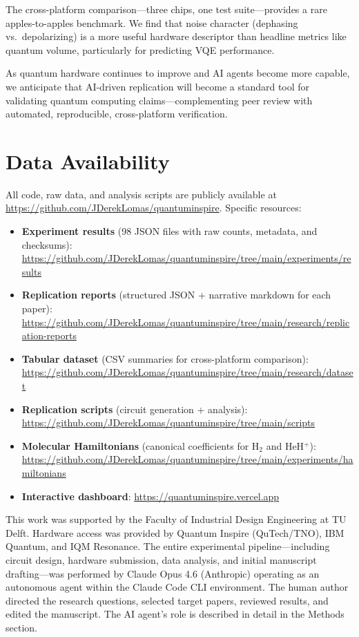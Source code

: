 \documentclass[twocolumn,prl,superscriptaddress,nofootinbib]{revtex4-2}
\begin{document}
The cross-platform comparison---three chips, one test suite---provides a rare apples-to-apples benchmark.
We find that noise character (dephasing vs.\ depolarizing) is a more useful hardware descriptor than headline metrics like quantum volume, particularly for predicting VQE performance.

As quantum hardware continues to improve and AI agents become more capable, we anticipate that AI-driven replication will become a standard tool for validating quantum computing claims---complementing peer review with automated, reproducible, cross-platform verification.

\section*{Data Availability}

All code, raw data, and analysis scripts are publicly available at \url{https://github.com/JDerekLomas/quantuminspire}. Specific resources:

\begin{itemize}
  \item \textbf{Experiment results} (98 JSON files with raw counts, metadata, and checksums): \url{https://github.com/JDerekLomas/quantuminspire/tree/main/experiments/results}
  \item \textbf{Replication reports} (structured JSON + narrative markdown for each paper): \url{https://github.com/JDerekLomas/quantuminspire/tree/main/research/replication-reports}
  \item \textbf{Tabular dataset} (CSV summaries for cross-platform comparison): \url{https://github.com/JDerekLomas/quantuminspire/tree/main/research/dataset}
  \item \textbf{Replication scripts} (circuit generation + analysis): \url{https://github.com/JDerekLomas/quantuminspire/tree/main/scripts}
  \item \textbf{Molecular Hamiltonians} (canonical coefficients for H$_2$ and HeH$^+$): \url{https://github.com/JDerekLomas/quantuminspire/tree/main/experiments/hamiltonians}
  \item \textbf{Interactive dashboard}: \url{https://quantuminspire.vercel.app}
\end{itemize}

\begin{acknowledgments}
This work was supported by the Faculty of Industrial Design Engineering at TU Delft.
Hardware access was provided by Quantum Inspire (QuTech/TNO), IBM Quantum, and IQM Resonance.
The entire experimental pipeline---including circuit design, hardware submission, data analysis, and initial manuscript drafting---was performed by Claude Opus 4.6 (Anthropic) operating as an autonomous agent within the Claude Code CLI environment.
The human author directed the research questions, selected target papers, reviewed results, and edited the manuscript.
The AI agent's role is described in detail in the Methods section.
\end{acknowledgments}


\end{document}
